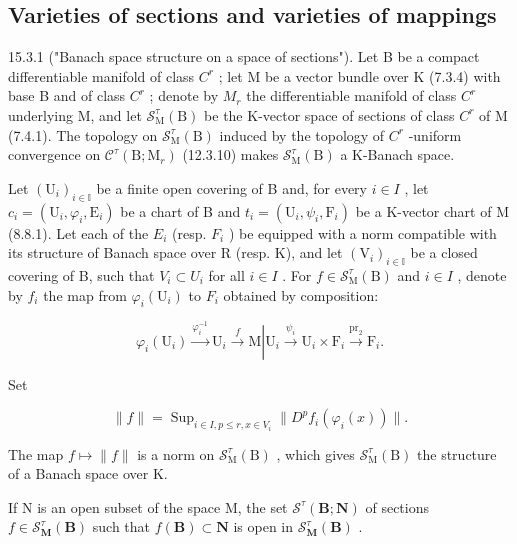 \subsection{Varieties of sections and varieties of mappings}

15.3.1 ("Banach space structure on a space of sections"). Let B be a compact differentiable manifold of class \(C^{r}\) ; let M be a vector bundle over K (7.3.4) with base B and of class \(C^{r}\) ; denote by \(M_{r}\) the differentiable manifold of class \(C^{r}\) underlying M, and let \(\mathcal{S}_{\mathrm{M}}^{\tau}(\mathrm{B})\) be the K-vector space of sections of class \(C^{r}\) of M (7.4.1). The topology on \(\mathcal{S}_{\mathrm{M}}^{\tau}(\mathrm{B})\) induced by the topology of \(C^{r}\) -uniform convergence on \(\mathcal{C}^{\tau}(\mathrm{B};\mathrm{M}_{r})\) (12.3.10) makes \(\mathcal{S}_{\mathrm{M}}^{\tau}(\mathrm{B})\) a K-Banach space.

Let \((\mathrm{U}_{i})_{i\in\mathbb{I}}\) be a finite open covering of B and, for every \(i\in I\) , let \(c_{i}=(\mathrm{U}_{i},\varphi_{i},\mathrm{E}_{i})\) be a chart of B and \(t_{i}=(\mathrm{U}_{i},\psi_{i},\mathrm{F}_{i})\) be a K-vector chart of M (8.8.1). Let each of the \(E_{i}\) (resp. \(F_{i}\) ) be equipped with a norm compatible with its structure of Banach space over R (resp. K), and let \((\mathrm{V}_{i})_{i\in\mathbb{I}}\) be a closed covering of B, such that \(V_{i}\subset U_{i}\) for all \(i\in I\) . For \(f\in\mathcal{S}_{\mathrm{M}}^{\tau}(\mathrm{B})\) and \(i\in I\) , denote by \(f_{i}\) the map from \(\varphi_{i}(\mathrm{U}_{i})\) to \(F_{i}\) obtained by composition:

\[
\varphi_ {i} \left(\mathrm{U} _ {i}\right) \xrightarrow {\varphi_ {i} ^ {- 1}} \mathrm{U} _ {i} \xrightarrow {f} \mathrm{M} \left| \mathrm{U} _ {i} \xrightarrow {\psi_ {i}} \mathrm{U} _ {i} \times \mathrm{F} _ {i} \xrightarrow {\operatorname{pr} _ {2}} \mathrm{F} _ {i}. \right.
\]

Set

\[
\| f \| = \operatorname{Sup} _ {i \in I, p \leqslant r, x \in V _ {i}} \| D ^ {p} f _ {i} (\varphi_ {i} (x)) \|.
\]

The map \(f\mapsto\|f\|\) is a norm on \(\mathcal{S}_{\mathrm{M}}^{\tau}(\mathrm{B})\) , which gives \(\mathcal{S}_{\mathrm{M}}^{\tau}(\mathrm{B})\) the structure of a Banach space over K.

If N is an open subset of the space M, the set \(\mathcal{S}^{\tau}(\mathbf{B};\mathbf{N})\) of sections \(f\in\mathcal{S}_{\mathbf{M}}^{\tau}(\mathbf{B})\) such that \(f(\mathbf{B})\subset\mathbf{N}\) is open in \(\mathcal{S}_{\mathbf{M}}^{\tau}(\mathbf{B})\) .

